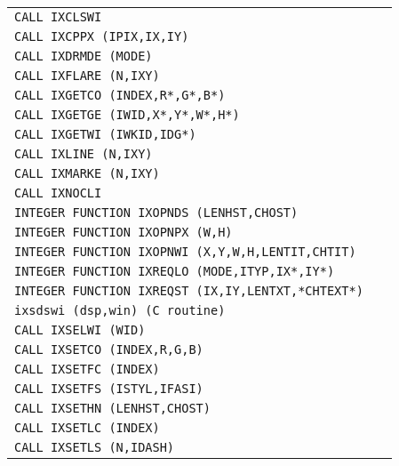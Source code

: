 \begin{longtable}{|>{\small\tt}p{.92\linewidth}r|}
CALL IXCLSWI                                          & \pageref{IXCLSWI}\\
CALL IXCPPX (IPIX,IX,IY)                              & \pageref{IXCPPX} \\
CALL IXDRMDE (MODE)                                   & \pageref{IXDRMDE}\\
CALL IXFLARE (N,IXY)                                  & \pageref{IXFLARE}\\
CALL IXGETCO (INDEX,R*,G*,B*)                         & \pageref{IXGETCO}\\
CALL IXGETGE (IWID,X*,Y*,W*,H*)                       & \pageref{IXGETGE}\\
CALL IXGETWI (IWKID,IDG*)                             & \pageref{IXGETWI}\\
CALL IXLINE (N,IXY)                                   & \pageref{IXLINE} \\
CALL IXMARKE (N,IXY)                                  & \pageref{IXMARKE}\\
CALL IXNOCLI                                          & \pageref{IXNOCLI}\\
INTEGER FUNCTION IXOPNDS (LENHST,CHOST)               & \pageref{IXOPNDS}\\
INTEGER FUNCTION IXOPNPX (W,H)                        & \pageref{IXOPNPX}\\
INTEGER FUNCTION IXOPNWI (X,Y,W,H,LENTIT,CHTIT)       & \pageref{IXOPNWI}\\
INTEGER FUNCTION IXREQLO (MODE,ITYP,IX*,IY*)          & \pageref{IXREQLO}\\
INTEGER FUNCTION IXREQST (IX,IY,LENTXT,*CHTEXT*)      & \pageref{IXREQST}\\
ixsdswi (dsp,win) (C routine)                         & \pageref{ixsdswi}\\
CALL IXSELWI (WID)                                    & \pageref{IXSELWI}\\
CALL IXSETCO (INDEX,R,G,B)                            & \pageref{IXSETCO}\\
CALL IXSETFC (INDEX)                                  & \pageref{IXSETFC}\\
CALL IXSETFS (ISTYL,IFASI)                            & \pageref{IXSETFS}\\
CALL IXSETHN (LENHST,CHOST)                           & \pageref{IXSETHN}\\
CALL IXSETLC (INDEX)                                  & \pageref{IXSETLC}\\
CALL IXSETLS (N,IDASH)                                & \pageref{IXSETLS}\\

\end{longtable}

